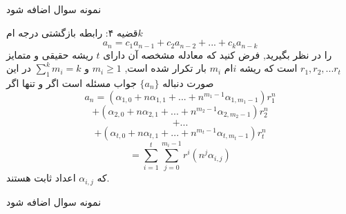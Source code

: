 \begin{PROBLEM}
    نمونه سوال اضافه شود
\end{PROBLEM}

\begin{THEOREM}
    \p
    قضیه ۴:
    رابطه‌ بازگشتی درجه 
    ام$k$
    \[a_n=c_{1}a_{n-1}+c_{2}a_{n-2}+...+c_{k}a_{n-k}\]
    را در نظر بگیرید, فرض کنید که معادله مشخصه آن دارای 
    $t$
    ریشه حقیقی و متمایز 
    $r_1, r_2, ...r_t $
    است که ریشه
    $i$ام 
    $m_i$
    بار تکرار شده است,  
    $m_i \geq 1$
    و
    $\sum_1^k m_i=k$
    در این صورت دنباله 
    $\{a_n\}$
    جواب مسئله است اگر و تنها اگر
    \[a_n=(\alpha_{1,0}+ n\alpha_{1,1}+...+n^{m_1-1}\alpha_{1,m_1-1})r_1^n\]
    \[+(\alpha_{2,0}+ n\alpha_{2,1}+...+n^{m_2-1}\alpha_{2,m_2-1})r_2^n\]
    \[+...\]
    \[+(\alpha_{t,0}+ n\alpha_{t,1}+...+n^{m_t-1}\alpha_{t,m_t-1})r_t^n\]
    \[=\sum_{i=1}^t\sum_{j=0}^{m_i-1}r^i(n^j\alpha_{i,j})\]
    که
    $\alpha_{i,j}$
    اعداد ثابت هستند.

\end{THEOREM}

\begin{PROBLEM}
    نمونه سوال اضافه شود
\end{PROBLEM}
